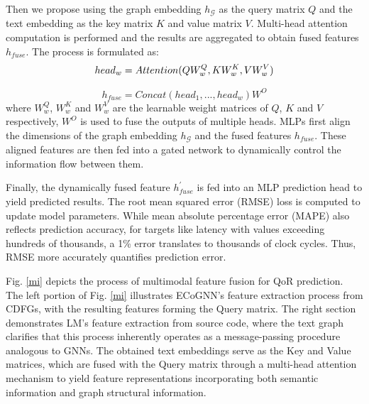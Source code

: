 \documentclass[conference]{IEEEtran}
\begin{document}
		Then we propose using the graph embedding $h_{\mathcal{G}}$ as the query matrix $Q$ and the text embedding as the key matrix $K$ and value matrix $V$. Multi-head attention computation is performed and the results are aggregated to obtain fused features $h_{fuse}$. The process is formulated as:
        \begin{equation}
		head_{w} = Attention(QW_w^Q, KW_w^K, VW_w^V)
			\vspace{-5mm}
	   \end{equation}
		
	   \begin{equation}
		h_{fuse} = Concat(head_{1},...,head_{w})W^O	
	   \end{equation}
        where $W_w^Q$, $W_w^K$ and $W_w^V$ are the learnable weight matrices of  $Q$, $K$ and $V$ respectively, $W^O$ is used to fuse the outputs of multiple heads. MLPs first align the dimensions of the graph embedding $h_{\mathcal{G}}$ and the fused features $h_{fuse}$. These aligned features are then fed into a gated network \cite{Li2016} to dynamically control the information flow between them.
        
		
		Finally, the dynamically fused feature $h_{fuse}^{'}$ is fed into an MLP prediction head to yield predicted results. The root mean squared error (RMSE) loss is computed to update model parameters. While mean absolute percentage error (MAPE) also reflects prediction accuracy, for targets like latency with values exceeding hundreds of thousands, a 1\% error translates to thousands of clock cycles. Thus, RMSE more accurately quantifies prediction error.
		
		Fig. \ref{mi} depicts the process of multimodal feature fusion for QoR prediction. The left portion of Fig. \ref{mi} illustrates ECoGNN's feature extraction process from CDFGs, with the resulting features forming the Query matrix. The right section demonstrates LM's feature extraction from source code, where the text graph \cite{Joshi2025} clarifies that this process inherently operates as a message-passing procedure analogous to GNNs. The obtained text embeddings serve as the Key and Value matrices, which are fused with the Query matrix through a multi-head attention mechanism to yield feature representations incorporating both semantic information and graph structural information.
        
\end{document}
